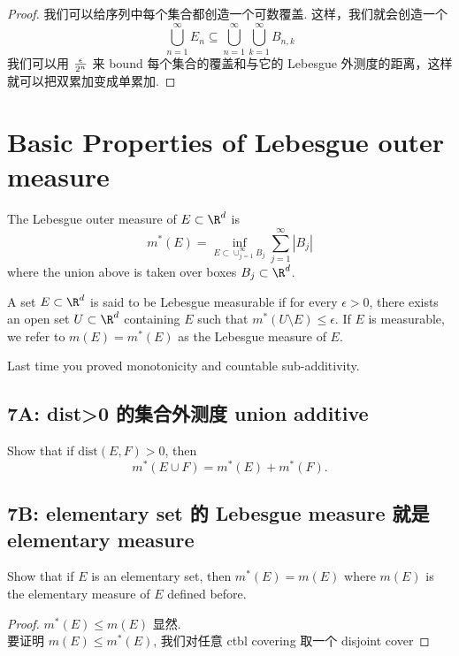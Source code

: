 \documentclass[lang=cn,11pt]{template}
\begin{document}
\begin{proof}
    我们可以给序列中每个集合都创造一个可数覆盖. 这样，我们就会创造一个 
    $$
    \bigcup_{n=1}^{\infty} E_n \subseteq \bigcup_{n=1}^{\infty} \bigcup_{k=1}^{\infty} B_{n,k}
    $$
    我们可以用 $\epsilon \over {2^n}$ 来 bound 每个集合的覆盖和与它的 Lebesgue 外测度的距离，这样就可以把双累加变成单累加.
\end{proof}


\newpage
\chapter{Basic Properties of Lebesgue outer measure}


  The Lebesgue outer measure of $E\subset \R^d$ is 
$$m^*(E)=\inf_{E\subset \cup_{j=1}^\infty B_j} \sum_{j=1}^\infty |B_j|
$$
where the union above is taken over boxes $B_j \subset \R^d$. 

 A set $E\subset \R^d$ is said to be Lebesgue measurable if for every $\epsilon>0$, there exists an open set $U\subset \R^d$ containing $E$ such that $m^*(U\setminus E)\leq \epsilon$. If $E$ is measurable, we refer to $m(E)=m^*(E)$ as the Lebesgue measure of $E$. 

Last time you proved monotonicity and countable sub-additivity.  

\section*{7A: dist>0 的集合外测度 union additive}
Show that if $\mathrm{dist}(E,F)>0$, then $$m^*(E\cup F)=m^*(E)+m^*(F).$$
 



\section*{7B: elementary set 的 Lebesgue measure 就是 elementary measure}
Show that if $E$ is an elementary set, then $m^*(E)=m(E)$ where $m(E)$ is the elementary measure of $E$ defined before.
\begin{proof}
    $m^*(E) \leq m(E)$ 显然. 
    \\要证明 $m(E) \leq m^*(E)$, 我们对任意 ctbl covering 取一个 disjoint cover   
\end{proof}
\end{document}
